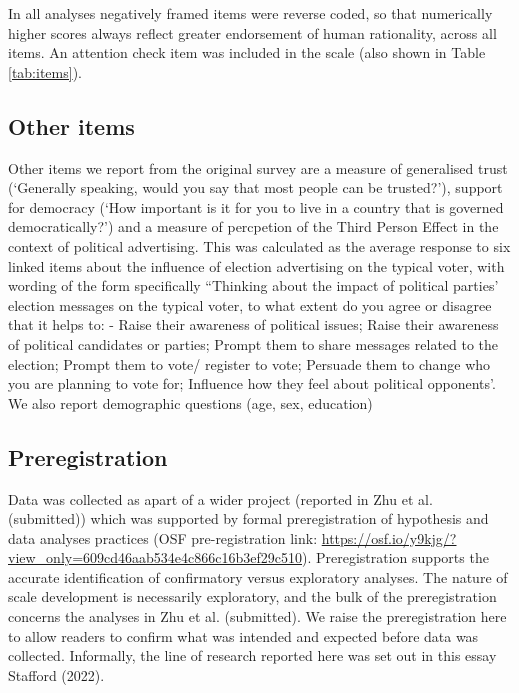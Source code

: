 \documentclass[
  ,jou,floatsintext]{apa6}
\begin{document}
In all analyses negatively framed items were reverse coded, so that numerically higher scores always reflect greater endorsement of human rationality, across all items. An attention check item was included in the scale (also shown in Table \ref{tab:items}).

\hypertarget{other-items}{%
\subsection{Other items}\label{other-items}}

Other items we report from the original survey are a measure of generalised trust (`Generally speaking, would you say that most people can be trusted?'), support for democracy (`How important is it for you to live in a country that is governed democratically?') and a measure of percpetion of the Third Person Effect in the context of political advertising. This was calculated as the average response to six linked items about the influence of election advertising on the typical voter, with wording of the form specifically ``Thinking about the impact of political parties' election messages on the typical voter, to what extent do you agree or disagree that it helps to: - Raise their awareness of political issues; Raise their awareness of political candidates or parties; Prompt them to share messages related to the election; Prompt them to vote/ register to vote; Persuade them to change who you are planning to vote for; Influence how they feel about political opponents'. We also report demographic questions (age, sex, education)

\hypertarget{preregistration}{%
\subsection{Preregistration}\label{preregistration}}

Data was collected as apart of a wider project (reported in Zhu et al. (submitted)) which was supported by formal preregistration of hypothesis and data analyses practices
(OSF pre-registration link: \url{https://osf.io/y9kjg/?view_only=609cd46aab534e4c866c16b3ef29c510}). Preregistration supports the accurate identification of confirmatory versus exploratory analyses. The nature of scale development is necessarily exploratory, and the bulk of the preregistration concerns the analyses in Zhu et al. (submitted). We raise the preregistration here to allow readers to confirm what was intended and expected before data was collected. Informally, the line of research reported here was set out in this essay Stafford (2022).
\end{document}
